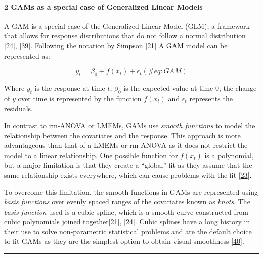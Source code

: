 \documentclass[
]{article}
\begin{document}
\hypertarget{gams-as-a-special-case-of-generalized-linear-models}{%
\paragraph{2 GAMs as a special case of Generalized Linear
Models}\label{gams-as-a-special-case-of-generalized-linear-models}}

A GAM is a special case of the Generalized Linear Model (GLM), a
framework that allows for response distributions that do not follow a
normal distribution {[}\protect\hyperlink{ref-wood2017}{24}{]},
{[}\protect\hyperlink{ref-hastie1987}{39}{]}. Following the notation by
Simpson {[}\protect\hyperlink{ref-simpson2018}{21}{]} A GAM model can be
represented as:

\begin{equation}
  y_{t}=\beta_0+f(x_t)+\epsilon_t  
  (\#eq:GAM)
\end{equation}

Where \(y_t\) is the response at time \(t\), \(\beta_0\) is the expected
value at time 0, the change of \(y\) over time is represented by the
function \(f(x_t)\) and \(\epsilon_t\) represents the residuals.

In contrast to rm-ANOVA or LMEMs, GAMs use \emph{smooth functions} to
model the relationship between the covariates and the response. This
approach is more advantageous than that of a LMEMs or rm-ANOVA as it
does not restrict the model to a linear relationship. One possible
function for \(f(x_t)\) is a polynomial, but a major limitation is that
they create a ``global'' fit as they assume that the same relationship
exists everywhere, which can cause problems with the fit
{[}\protect\hyperlink{ref-beck1998}{23}{]}.

To overcome this limitation, the smooth functions in GAMs are
represented using \emph{basis functions} over evenly spaced ranges of
the covariates known as \emph{knots}. The \emph{basis function} used is
a cubic spline, which is a smooth curve constructed from cubic
polynomials joined
together{[}\protect\hyperlink{ref-simpson2018}{21}{]},
{[}\protect\hyperlink{ref-wood2017}{24}{]}. Cubic splines have a long
history in their use to solve non-parametric statistical problems and
are the default choice to fit GAMs as they are the simplest option to
obtain visual smoothness {[}\protect\hyperlink{ref-wegman1983}{40}{]}.

\begin{center}\rule{0.5\linewidth}{0.5pt}\end{center}
\end{document}
